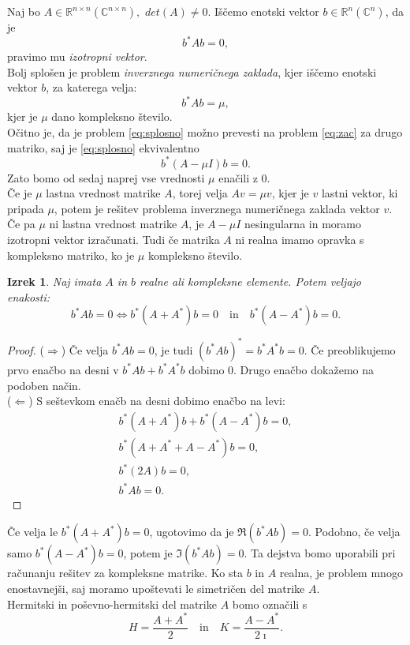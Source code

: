 \documentclass[12pt,a4paper]{amsart}
\theoremstyle{definition}
\theoremstyle{plain}
\newtheorem{izrek}[definicija]{Izrek}
\newcommand{\R}{\mathbb R}
\newcommand{\C}{\mathbb C}
\begin{document}
Naj bo $A\in\R^{n\times n} (\C^{n\times n}),$ $det(A)\ne 0$. Iščemo enotski vektor $b\in\R^{n} (\C^{n})$, da je
\begin{equation}\label{eq:zac}
b^\ast Ab=0,
\end{equation}
pravimo mu \emph{izotropni vektor}. \\
Bolj splošen je problem \emph{inverznega numeričnega zaklada}, kjer iščemo enotski vektor $b$, za katerega velja:
\begin{equation}\label{eq:splosno}
b^\ast Ab=\mu,
\end{equation}
kjer je $\mu$ dano kompleksno število.\\
Očitno je, da je problem \eqref{eq:splosno} možno prevesti na problem \eqref{eq:zac} za drugo matriko, saj je \eqref{eq:splosno} ekvivalentno
$$b^\ast (A-\mu I)b=0.$$
Zato bomo od sedaj naprej vse vrednosti $\mu$ enačili z $0$.\\
Če je $\mu$ lastna vrednost matrike $A$, torej velja $Av=\mu v$, kjer je $v$ lastni vektor, ki pripada $\mu$, potem je rešitev problema inverznega numeričnega zaklada vektor $v$. 
Če pa $\mu$ ni lastna vrednost matrike $A$, je $A-\mu I$ nesingularna in moramo izotropni vektor izračunati.
Tudi če matrika $A$ ni realna imamo opravka s kompleksno matriko, ko je $\mu$ kompleksno število. 
\begin{izrek}
Naj imata $A$ in $b$ realne ali kompleksne elemente. Potem veljajo enakosti:
$$b^\ast Ab=0\Leftrightarrow b^\ast (A+A^\ast)b=0\quad \textrm{in} \quad b^\ast(A-A^\ast)b=0.$$
\end{izrek}
\begin{proof}
($\Rightarrow$) Če velja $b^\ast Ab=0$, je tudi $(b^\ast Ab)^\ast=b^\ast A^\ast b=0$. Če preoblikujemo prvo enačbo na desni v $b^\ast Ab +b^\ast A^\ast b$ dobimo 0. Drugo enačbo dokažemo na podoben način.\\
($\Leftarrow$) S seštevkom enačb na desni dobimo enačbo na levi:
\begin{align*}
 b^\ast (A+A^\ast)b+b^\ast(A-A^\ast)b=0,\\
b^\ast (A+A^\ast+A-A^\ast)b=0,\\
b^\ast (2A)b=0,\\
b^\ast Ab=0.
\end{align*}
\end{proof}

Če velja le $b^\ast (A+A^\ast)b=0$, ugotovimo da je $\Re(b^\ast Ab)=0$. Podobno, če velja samo $b^\ast(A-A^\ast)b=0$, potem je $\Im(b^\ast Ab)=0$. Ta dejstva bomo uporabili pri računanju rešitev za kompleksne matrike. 
Ko sta $b$ in $A$ realna, je problem mnogo enostavnejši, saj moramo upoštevati le simetričen del matrike $A$.\\
Hermitski in poševno-hermitski del matrike $A$ bomo označili s $$H=\frac{A+A^\ast}{2}\quad \text{in} \quad K=\frac{A-A^\ast}{2\imath}.$$
\end{document}
